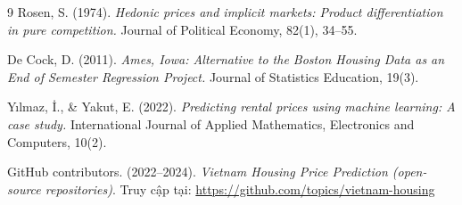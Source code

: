 \begin{thebibliography}{9}
    Rosen, S. (1974).
    \textit{Hedonic prices and implicit markets: Product differentiation in pure competition.}
    Journal of Political Economy, 82(1), 34--55.

    De Cock, D. (2011).
    \textit{Ames, Iowa: Alternative to the Boston Housing Data as an End of Semester Regression Project.}
    Journal of Statistics Education, 19(3).

    Yılmaz, İ., \& Yakut, E. (2022).
    \textit{Predicting rental prices using machine learning: A case study.}
    International Journal of Applied Mathematics, Electronics and Computers, 10(2).

    GitHub contributors. (2022--2024).
    \textit{Vietnam Housing Price Prediction (open-source repositories)}.
    Truy cập tại: \url{https://github.com/topics/vietnam-housing}
\end{thebibliography}
